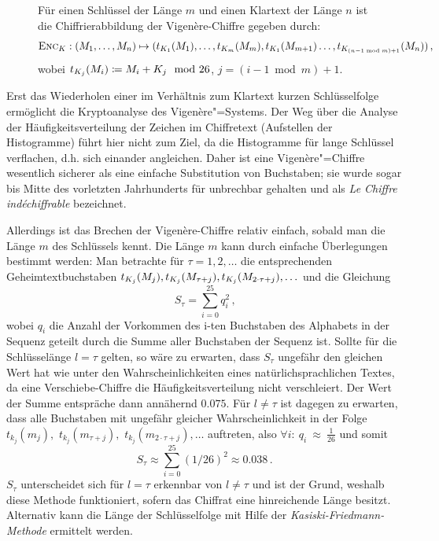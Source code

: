 \begin{figure}[h]
	Für einen Schlüssel der Länge $m$  und einen Klartext der Länge $n$ ist die Chiffrierabbildung der Vigenère-Chiffre gegeben durch:
	\begin{align*}
		\textsc{Enc}_{K} : (M_1,\ldots,M_{n}) \mapsto (t_{K_1}(M_1),\ldots,t_{K_{m}}(M_{m}),t_{K_1}(M_{m+1})\ldots,t_{K_{(n-1 \bmod m)+1}}(M_{n}))\, ,
	\end{align*}
	wobei $t_{K_{j}}(M_{i}) \coloneqq M_{i} + K_{j} \mod 26$, $j = (i-1 \bmod m)+1$.
\end{figure}
Erst das Wiederholen einer im Verhältnis zum Klartext kurzen Schlüsselfolge ermöglicht die Kryptoanalyse des Vigenère"=Systems.
Der Weg über die Analyse der Häufigkeitsverteilung der Zeichen im Chiffretext (Aufstellen der Histogramme) führt hier nicht zum Ziel, da die Histogramme für
lange Schlüssel verflachen, d.h. sich einander angleichen. Daher ist eine Vigenère"=Chiffre wesentlich sicherer als eine einfache Substitution von
Buchstaben; sie wurde sogar bis Mitte des vorletzten Jahrhunderts für unbrechbar gehalten und als \emph{Le Chiffre indéchiffrable} bezeichnet.

Allerdings ist das Brechen der Vigenère-Chiffre relativ einfach, sobald man die Länge $m$ des Schlüssels kennt. Die Länge $m$ kann durch einfache Überlegungen bestimmt werden: Man betrachte für $\tau = 1,2,\ldots$ die entsprechenden Geheimtextbuchstaben $t_{K_j}(M_j),t_{K_j}(M_{\tau+j}),t_{K_j}(M_{2 \cdot \tau+j}),\ldots$ und die Gleichung
\begin{equation*}
	S_{\tau}=	\sum_{i=0}^{25} q^2_i \, \text{,}
\end{equation*}
wobei $q_i$ die Anzahl der Vorkommen des i-ten Buchstaben des Alphabets in der Sequenz geteilt durch die Summe aller Buchstaben der Sequenz ist. Sollte für die
Schlüsselänge $l = \tau$ gelten, so wäre zu erwarten, dass $S_{\tau}$ ungefähr den gleichen Wert hat wie unter den Wahrscheinlichkeiten eines
natürlichsprachlichen Textes, da eine Verschiebe-Chiffre die Häufigkeitsverteilung nicht verschleiert. Der Wert der Summe entspräche dann annähernd $0.075$.
Für $l \neq \tau$ ist dagegen zu erwarten, dass alle Buchstaben mit ungefähr gleicher Wahrscheinlichkeit in der Folge $t_{k_j}(m_j),$ $t_{k_j}(m_{\tau+j}),$ $t_{k_j}(m_{2 \cdot \tau+j}),\ldots$ auftreten, also $\forall i\colon~q_i~\approx~\frac{1}{26}$ und somit
\begin{equation*}
	S_{\tau} \approx \sum_{i=0}^{25} (1/26)^2 \approx 0.038 \,\text{.}
\end{equation*}
$S_{\tau}$ unterscheidet sich für $l = \tau$ erkennbar von $l \neq \tau$ und ist der Grund, weshalb diese Methode funktioniert, sofern das Chiffrat eine hinreichende Länge besitzt. Alternativ kann die Länge der Schlüsselfolge mit Hilfe der \emph{Kasiski-Friedmann-Methode} \cite{Kasiski1863} ermittelt werden.

